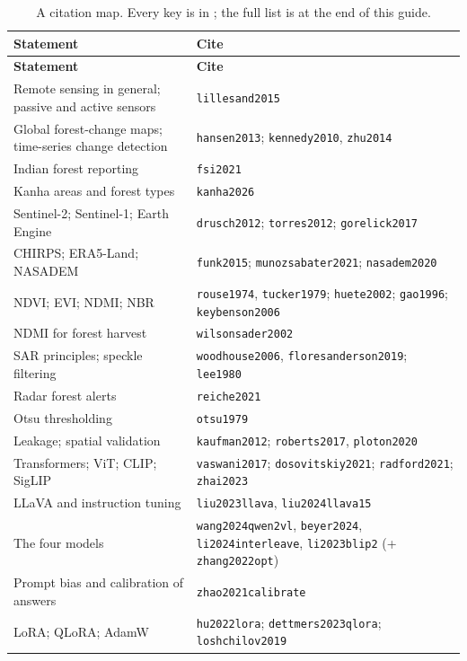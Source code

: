 \begin{longtable}{L{7.6cm}L{6.6cm}}
\caption{A citation map. Every key is in ; the full list is at the end of this guide.}\label{tab:citemap}\\
\toprule
\textbf{Statement} & \textbf{Cite} \\
\midrule
\endfirsthead
\toprule
\textbf{Statement} & \textbf{Cite} \\
\midrule
\endhead
Remote sensing in general; passive and active sensors & \texttt{lillesand2015} \\
Global forest-change maps; time-series change detection & \texttt{hansen2013}; \texttt{kennedy2010}, \texttt{zhu2014} \\
Indian forest reporting & \texttt{fsi2021} \\
Kanha areas and forest types & \texttt{kanha2026} \\
Sentinel-2; Sentinel-1; Earth Engine & \texttt{drusch2012}; \texttt{torres2012}; \texttt{gorelick2017} \\
CHIRPS; ERA5-Land; NASADEM & \texttt{funk2015}; \texttt{munozsabater2021}; \texttt{nasadem2020} \\
NDVI; EVI; NDMI; NBR & \texttt{rouse1974}, \texttt{tucker1979}; \texttt{huete2002}; \texttt{gao1996}; \texttt{keybenson2006} \\
NDMI for forest harvest & \texttt{wilsonsader2002} \\
SAR principles; speckle filtering & \texttt{woodhouse2006}, \texttt{floresanderson2019}; \texttt{lee1980} \\
Radar forest alerts & \texttt{reiche2021} \\
Otsu thresholding & \texttt{otsu1979} \\
Leakage; spatial validation & \texttt{kaufman2012}; \texttt{roberts2017}, \texttt{ploton2020} \\
Transformers; ViT; CLIP; SigLIP & \texttt{vaswani2017}; \texttt{dosovitskiy2021}; \texttt{radford2021}; \texttt{zhai2023} \\
LLaVA and instruction tuning & \texttt{liu2023llava}, \texttt{liu2024llava15} \\
The four models & \texttt{wang2024qwen2vl}, \texttt{beyer2024}, \texttt{li2024interleave}, \texttt{li2023blip2} (+ \texttt{zhang2022opt}) \\
Prompt bias and calibration of answers & \texttt{zhao2021calibrate} \\
LoRA; QLoRA; AdamW & \texttt{hu2022lora}; \texttt{dettmers2023qlora}; \texttt{loshchilov2019} \\

\end{longtable}
